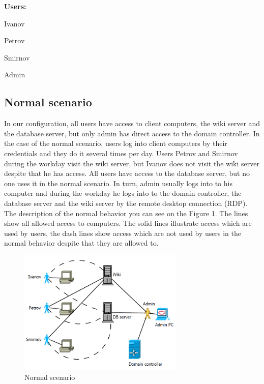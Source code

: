 \begin{compactitem}
\item [\textbf{Users:}]
\item Ivanov
\item Petrov
\item Smirnov
\item Admin
\end{compactitem}
     
\subsection{Normal scenario}
In our configuration, all users have access to client computers, the wiki server and the database server, but only admin has direct access to the domain controller. In the case of the normal scenario, users log into client computers by their credentials and they do it several times per day. Users Petrov and Smirnov during the workday visit the wiki server, but Ivanov does not visit the wiki server despite that he has access. All users have access to the database server, but no one uses it in the normal scenario. In turn, admin usually logs into to his computer and during the workday he logs into to the domain controller, the database server and the wiki server by the remote desktop connection (RDP). The description of the normal behavior you can see on the Figure 1. The lines show all allowed access to computers. The solid lines illustrate access which are used by users, the dash lines show access which are not used by users in the normal behavior despite that they are allowed to. 

\begin{figure}[ht!]
\centering
\includegraphics[width=0.7\textwidth]{scenario_normal.png}
\caption{Normal scenario}
\label{overflow}
\end{figure}

